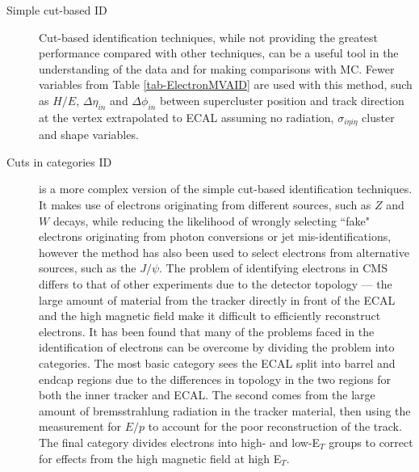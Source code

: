 \begin{description}
	\item[Simple cut-based ID] Cut-based identification techniques, while not providing the greatest performance compared with other techniques, can be a useful tool in the understanding of the data and for making comparisons with MC.  Fewer variables from Table \ref{tab-ElectronMVAID} are used with this method, such as $H/E$, $\Delta \eta_{in}$ and $\Delta \phi_{in}$ between supercluster position and track direction at the vertex extrapolated to ECAL assuming no radiation, $\sigma_{i \eta i \eta}$ cluster and shape variables. \cite{CutBasedEleID}
	\item[Cuts in categories ID] is a more complex version of the simple cut-based identification techniques. It makes use of electrons originating from different sources, such as $Z$ and $W$ decays, while reducing the likelihood of wrongly selecting ``fake" electrons originating from photon conversions or jet mis-identifications, however the method has also been used to select electrons from alternative sources, such as the $J/\psi$. The problem of identifying electrons in CMS differs to that of other experiments due to the detector topology --- the large amount of material from the tracker directly in front of the ECAL and the high magnetic field make it difficult to efficiently reconstruct electrons. It has been found that many of the problems faced in the identification of electrons can be overcome by dividing the problem into categories. The most basic category sees the ECAL split into barrel and endcap regions due to the differences in topology in the two regions for both the inner tracker and ECAL. The second comes from the large amount of bremsstrahlung radiation in the tracker material, then using the measurement for $E/p$ to account for the poor reconstruction of the track. The final category divides electrons into high- and low-E$_T$ groups to correct for effects from the high magnetic field at high E$_T$.


\end{description}
